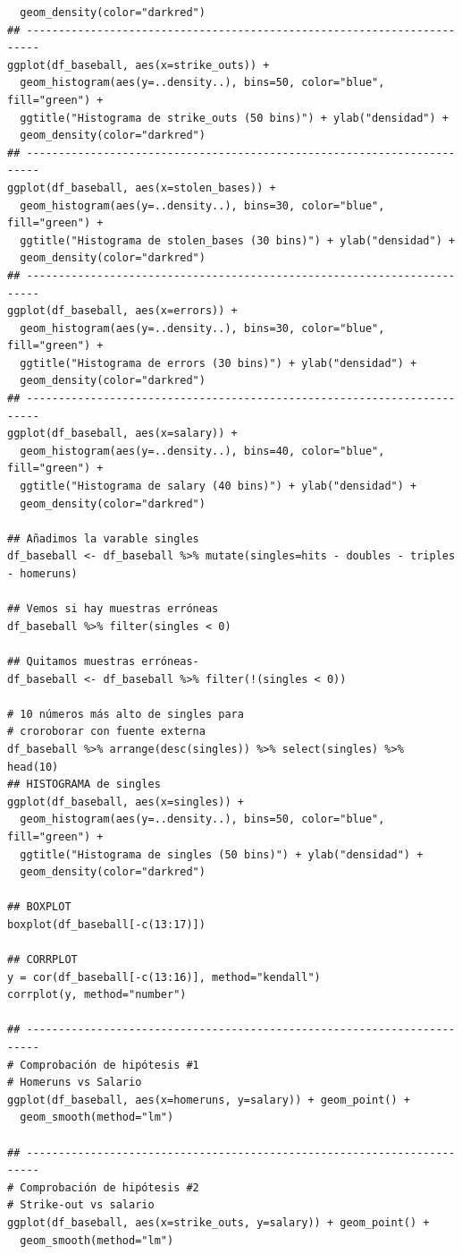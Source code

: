 \documentclass[a4paper,12pt, oneside]{book}
\begin{document}
\begin{verbatim}
  geom_density(color="darkred")
## ------------------------------------------------------------------------
ggplot(df_baseball, aes(x=strike_outs)) + 
  geom_histogram(aes(y=..density..), bins=50, color="blue", fill="green") +
  ggtitle("Histograma de strike_outs (50 bins)") + ylab("densidad") + 
  geom_density(color="darkred")
## ------------------------------------------------------------------------
ggplot(df_baseball, aes(x=stolen_bases)) + 
  geom_histogram(aes(y=..density..), bins=30, color="blue", fill="green") +
  ggtitle("Histograma de stolen_bases (30 bins)") + ylab("densidad") + 
  geom_density(color="darkred")
## ------------------------------------------------------------------------
ggplot(df_baseball, aes(x=errors)) +
  geom_histogram(aes(y=..density..), bins=30, color="blue", fill="green") +
  ggtitle("Histograma de errors (30 bins)") + ylab("densidad") + 
  geom_density(color="darkred")
## ------------------------------------------------------------------------
ggplot(df_baseball, aes(x=salary)) + 
  geom_histogram(aes(y=..density..), bins=40, color="blue", fill="green") +
  ggtitle("Histograma de salary (40 bins)") + ylab("densidad") + 
  geom_density(color="darkred")

## Añadimos la varable singles
df_baseball <- df_baseball %>% mutate(singles=hits - doubles - triples - homeruns)

## Vemos si hay muestras erróneas
df_baseball %>% filter(singles < 0)

## Quitamos muestras erróneas-
df_baseball <- df_baseball %>% filter(!(singles < 0))

# 10 números más alto de singles para
# croroborar con fuente externa
df_baseball %>% arrange(desc(singles)) %>% select(singles) %>% head(10)
## HISTOGRAMA de singles
ggplot(df_baseball, aes(x=singles)) + 
  geom_histogram(aes(y=..density..), bins=50, color="blue", fill="green") +
  ggtitle("Histograma de singles (50 bins)") + ylab("densidad") +
  geom_density(color="darkred")

## BOXPLOT
boxplot(df_baseball[-c(13:17)])

## CORRPLOT
y = cor(df_baseball[-c(13:16)], method="kendall")
corrplot(y, method="number")

## ------------------------------------------------------------------------
# Comprobación de hipótesis #1
# Homeruns vs Salario
ggplot(df_baseball, aes(x=homeruns, y=salary)) + geom_point() + 
  geom_smooth(method="lm")

## ------------------------------------------------------------------------
# Comprobación de hipótesis #2
# Strike-out vs salario
ggplot(df_baseball, aes(x=strike_outs, y=salary)) + geom_point() + 
  geom_smooth(method="lm")


\end{verbatim}
\end{document}
